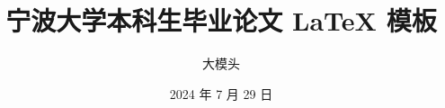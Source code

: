 \documentclass{NBUThesis}
\title{宁波大学本科生毕业论文 \LaTeX{} 模板}
\author{大模头}
\date{2024 年 7 月 29 日}
\begin{document}
\maketitle        %
\frontmatter
\commitment       %
\tableofcontents  %



\mainmatter       %




 



\appendix

\end{document}
